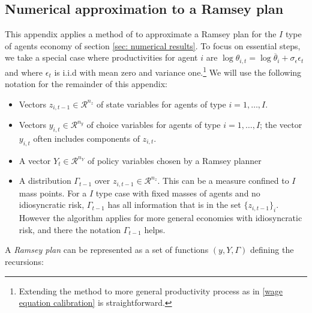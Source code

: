 \documentclass[thmsb,11pt]{article}
\begin{document}
\subsection{Numerical approximation to a Ramsey plan}\label{appndx: numerical appendix}
This appendix applies a method of \cite{Evans2014} to approximate a Ramsey plan for the $I$ type of agents economy of section \ref{sec: numerical results}. To focus on essential steps, we take a special case where productivities
for agent $i$ are $\log \theta_{i,t}=\log \overline{\theta}_i+\sigma_{\epsilon} \epsilon_t$ and where $\epsilon_t$ is i.i.d with mean zero and variance one.\footnote{Extending the method to more general productivity process as in \eqref{wage equation calibration} is straightforward.}
We will use the following notation for the remainder of this appendix:

\begin{itemize}

\item Vectors $z_{i,{t-1}} \in \mathcal{R}^{n_z}$ of state variables for agents of type  $i =1, \ldots, I$.
\item Vectors $y_{i,t} \in \mathcal{R}^{n_y}$ of choice variables for agents of type $i =1, \ldots, I$; the vector $y_{i,t}$ often includes components of $z_{i,t}$.
\item A vector $Y_t \in \mathcal{R}^{n_Y}$ of   policy variables chosen by a Ramsey planner
\item A distribution $\Gamma_{t-1}$ over $z_{i,t-1}\in \mathcal{R}^{n_z}$. This can be a measure confined to $I$ mass points. For a $I$ type case with fixed masses of agents and no idiosyncratic risk, $\Gamma_{t-1}$ has all information that is in the set $\{z_{i,t-1}\}_i$. However the algorithm applies for more general economies with idiosyncratic risk, and there the notation $\Gamma_{t-1}$  helps.

\end{itemize}

\noindent A {\em Ramsey plan} can be represented as a set of functions $\left(y,Y,\Gamma\right)$ defining the recursions:
\end{document}

